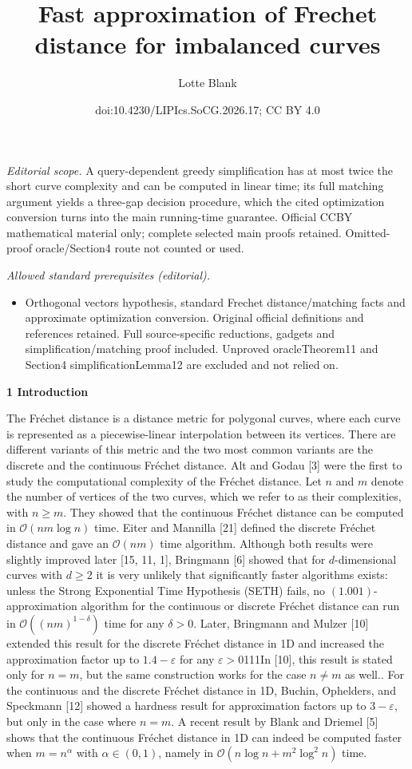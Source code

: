 \documentclass[10pt,a4paper]{article}
\title{Fast approximation of Frechet distance for imbalanced curves}
\author{Lotte Blank}
\date{doi:10.4230/LIPIcs.SoCG.2026.17; CC BY 4.0}
\begin{document}
\maketitle
\noindent\textit{Editorial scope.} A query-dependent greedy simplification has at most twice the short curve complexity and can be computed in linear time; its full matching argument yields a three-gap decision procedure, which the cited optimization conversion turns into the main running-time guarantee. Official CCBY mathematical material only; complete selected main proofs retained. Omitted-proof oracle/Section4 route not counted or used.\par\medskip
\noindent\textit{Allowed standard prerequisites (editorial).}\begin{itemize}
\item Orthogonal vectors hypothesis, standard Frechet distance/matching facts and approximate optimization conversion. Original official definitions and references retained. Full source-specific reductions, gadgets and simplification/matching proof included. Unproved oracleTheorem11 and Section4 simplificationLemma12 are excluded and not relied on.
\end{itemize}\medskip
\par\medskip\noindent\textbf{1 Introduction}\par
The Fréchet distance is a distance metric for polygonal curves, where each curve is represented as a piecewise-linear interpolation between its vertices. There are different variants of this metric and the two most common variants are the discrete and the continuous Fréchet distance. Alt and Godau [3] were the first to study the computational complexity of the Fréchet distance. Let $n$ and $m$ denote the number of vertices of the two curves, which we refer to as their complexities, with $n\geq m$. They showed that the continuous Fréchet distance can be computed in $\mathcal{O}(nm\log n)$ time. Eiter and Mannilla [21] defined the discrete Fréchet distance and gave an $\mathcal{O}(nm)$ time algorithm. Although both results were slightly improved later [15, 11, 1], Bringmann [6] showed that for $d$-dimensional curves with $d\geq 2$ it is very unlikely that significantly faster algorithms exists: unless the Strong Exponential Time Hypothesis (SETH) fails, no $(1.001)$-approximation algorithm for the continuous or discrete Fréchet distance can run in $\mathcal{O}((nm)^{1-\delta})$ time for any $\delta>0$. Later, Bringmann and Mulzer [10] extended this result for the discrete Fréchet distance in 1D and increased the approximation factor up to $1.4-\varepsilon$ for any $\varepsilon>0$111In [10], this result is stated only for $n=m$, but the same construction works for the case $n\neq m$ as well.. For the continuous and the discrete Fréchet distance in 1D, Buchin, Ophelders, and Speckmann [12] showed a hardness result for approximation factors up to $3-\varepsilon$, but only in the case where $n=m$. A recent result by Blank and Driemel [5] shows that the continuous Fréchet distance in 1D can indeed be computed faster when $m=n^{\alpha}$ with $\alpha\in(0,1)$, namely in $\mathcal{O}(n\log n+m^{2}\log^{2}n)$ time.
\end{document}
